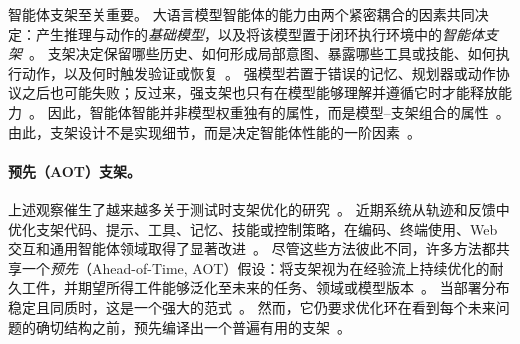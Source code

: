 \documentclass{article}
\begin{document}
\label{sec:introduction}
{智能体支架至关重要。}
大语言模型智能体的能力由两个紧密耦合的因素共同决定：产生推理与动作的\textit{基础模型}，以及将该模型置于闭环执行环境中的\textit{智能体支架}~\citep{meng2026agent,zhou2026externalizationllmagentsunified,ning2026code}。
支架决定保留哪些历史、如何形成局部意图、暴露哪些工具或技能、如何执行动作，以及何时触发验证或恢复~\citep{meng2026agent,zhou2026externalizationllmagentsunified}。
强模型若置于错误的记忆、规划器或动作协议之后也可能失败；反过来，强支架也只有在模型能够理解并遵循它时才能释放能力~\citep{lee2026metaharnessendtoendoptimizationmodel,lin2026agenticharnessengineeringobservabilitydriven}。
因此，智能体智能并非模型权重独有的属性，而是模型--支架组合的属性~\citep{lee2026metaharnessendtoendoptimizationmodel,zhou2026externalizationllmagentsunified}。
由此，支架设计不是实现细节，而是决定智能体性能的一阶因素~\citep{meng2026agent,lin2026agenticharnessengineeringobservabilitydriven}。

\vspace{-0.5em}
\paragraph{预先（AOT）支架。} 上述观察催生了越来越多关于测试时支架优化的研究~\citep{lee2026metaharnessendtoendoptimizationmodel,lin2026agenticharnessengineeringobservabilitydriven}。
近期系统从轨迹和反馈中优化支架代码、提示、工具、记忆、技能或控制策略，在编码、终端使用、Web 交互和通用智能体领域取得了显著改进~\citep{lee2026metaharnessendtoendoptimizationmodel,lin2026agenticharnessengineeringobservabilitydriven}。
尽管这些方法彼此不同，许多方法都共享一个\textit{预先}（Ahead-of-Time, AOT）假设：将支架视为在经验流上持续优化的耐久工件，并期望所得工件能够泛化至未来的任务、领域或模型版本~\citep{lee2026metaharnessendtoendoptimizationmodel,lin2026agenticharnessengineeringobservabilitydriven}。
当部署分布稳定且同质时，这是一个强大的范式~\citep{lin2026agenticharnessengineeringobservabilitydriven,zhang2025memevolve}。
然而，它仍要求优化环在看到每个未来问题的确切结构之前，预先编译出一个普遍有用的支架~\citep{lee2026metaharnessendtoendoptimizationmodel}。




\vspace{-0.5em}
\end{document}
